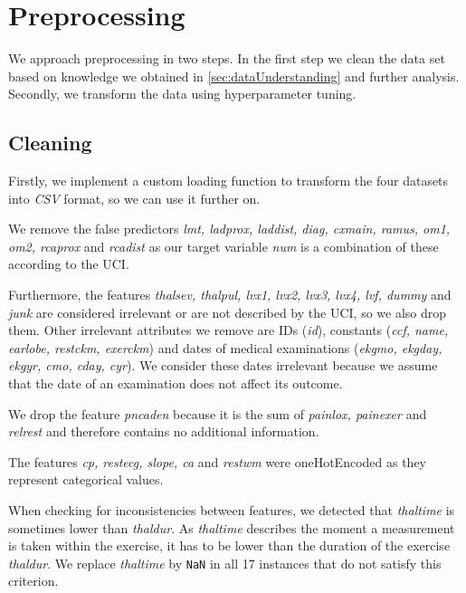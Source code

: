 \section{Preprocessing} \label{sec:preprocessing}

We approach preprocessing in two steps. In the first step we clean the data set based on knowledge we obtained in \cref{sec:dataUnderstanding} and further analysis. 
Secondly, we transform the data using hyperparameter tuning.

\subsection{Cleaning}
Firstly, we implement a custom loading function to transform the four datasets into \emph{CSV} format, so we can use it further on.

We remove the false predictors \emph{lmt, ladprox, laddist, diag, cxmain, ramus, om1, om2, rcaprox} and \emph{rcadist}  as our target variable \emph{num} is a combination of these according to the UCI. %

Furthermore, the features \emph{thalsev, thalpul, lvx1, lvx2, lvx3, lvx4, lvf, dummy} and \emph{junk} are considered irrelevant or are not described by the UCI, so we also drop them. Other irrelevant attributes we remove are IDs (\emph{id}), constants (\emph{ccf, name, earlobe, restckm, exerckm}) and dates of medical examinations (\emph{ekgmo, ekgday, ekgyr, cmo, cday, cyr}). We consider these dates irrelevant because we assume that the date of  an examination does not affect its outcome. 

We drop the feature \emph{pncaden} because it is the sum of \emph{painlox, painexer} and \emph{relrest} and therefore contains no additional information. 

The features \emph{cp, restecg, slope, ca} and \emph{restwm} were oneHotEncoded as they represent categorical values.

When checking for inconsistencies between features, we detected that \emph{thaltime} is sometimes lower than \emph{thaldur}. As \emph{thaltime} describes the moment a measurement is taken within the exercise, it has to be lower than the duration of the exercise \emph{thaldur}. We replace \emph{thaltime} by \texttt{NaN} in all 17 instances that do not satisfy this criterion. 


